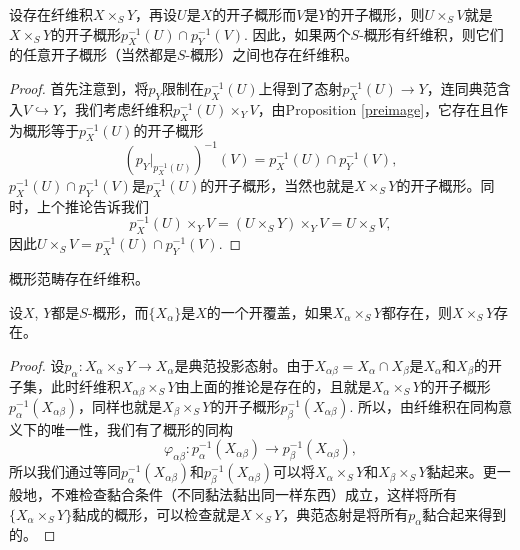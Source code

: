 
\begin{coro}
设存在纤维积$X\times_S Y$，再设$U$是$X$的开子概形而$V$是$Y$的开子概形，则$U\times_S V$就是$X\times_S Y$的开子概形$p_X^{-1}(U)\cap p_Y^{-1}(V)$. 因此，如果两个$S$-概形有纤维积，则它们的任意开子概形（当然都是$S$-概形）之间也存在纤维积。
\end{coro}

\begin{proof}
首先注意到，将$p_Y$限制在$p_X^{-1}(U)$上得到了态射$p_X^{-1}(U)\to Y$，连同典范含入$V\hookrightarrow Y$，我们考虑纤维积$p_X^{-1}(U)\times_Y V$，由Proposition \ref{preimage}，它存在且作为概形等于$p_X^{-1}(U)$的开子概形
\[
	\left(p_Y|_{p_X^{-1}(U)}\right)^{-1}(V)=p_X^{-1}(U)\cap p_Y^{-1}(V),
\]
$p_X^{-1}(U)\cap p_Y^{-1}(V)$是$p_X^{-1}(U)$的开子概形，当然也就是$X\times_S Y$的开子概形。同时，上个推论告诉我们
\[
	p_X^{-1}(U)\times_Y V=(U\times_S Y)\times_Y V=U\times_S V,
\]
因此$U\times_S V=p_X^{-1}(U)\cap p_Y^{-1}(V)$. 
\end{proof}


\begin{thm}[纤维积的存在性]\label{thm:1.5.9}
概形范畴存在纤维积。
\end{thm}

\begin{lem}
设$X$, $Y$都是$S$-概形，而$\{X_\alpha\}$是$X$的一个开覆盖，如果$X_\alpha\times_S Y$都存在，则$X\times_S Y$存在。
\end{lem}

\begin{proof}
设$p_\alpha:X_\alpha\times_S Y\to X_\alpha$是典范投影态射。由于$X_{\alpha\beta}=X_{\alpha}\cap X_{\beta}$是$X_{\alpha}$和$X_{\beta}$的开子集，此时纤维积$X_{\alpha\beta}\times_S Y$由上面的推论是存在的，且就是$X_\alpha\times_S Y$的开子概形$p_\alpha^{-1}(X_{\alpha\beta})$，同样也就是$X_\beta\times_S Y$的开子概形$p_\beta^{-1}(X_{\alpha\beta})$. 所以，由纤维积在同构意义下的唯一性，我们有了概形的同构
\[
	\varphi_{\alpha\beta}:p_\alpha^{-1}(X_{\alpha\beta})\to p_\beta^{-1}(X_{\alpha\beta}),
\]
所以我们通过等同$p_\alpha^{-1}(X_{\alpha\beta})$和$p_\beta^{-1}(X_{\alpha\beta})$可以将$X_\alpha\times_S Y$和$X_\beta\times_S Y$黏起来。更一般地，不难检查黏合条件（不同黏法黏出同一样东西）成立，这样将所有$\{X_\alpha\times_S Y\}$黏成的概形，可以检查就是$X\times_S Y$，典范态射是将所有$p_\alpha$黏合起来得到的。
\end{proof}


